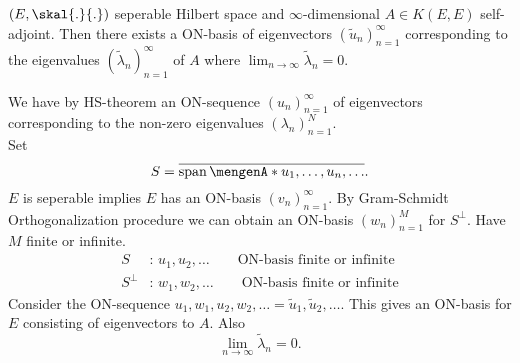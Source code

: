 \begin{theorem}
	$(E,\skal{.}{.})$ seperable Hilbert space and $\infty$-dimensional $A \in K(E,E)$ self-adjoint. Then there exists a ON-basis of eigenvectors $(\tilde u_n)_{n=1}^{\infty}$ corresponding to the eigenvalues $(\tilde \lambda_n)_{n=1}^{\infty}$ of $A$ where $\lim_{n \to \infty} \tilde \lambda_n = 0$.
\end{theorem}
\begin{beweis}
	We have by HS-theorem an ON-sequence $(u_n)_{n=1}^{\infty}$ of eigenvectors corresponding to the non-zero eigenvalues $(\lambda_n)_{n=1}^{N}$. \\
	Set
	\[
		S = \overline{\spn\set{u_1,\dots,u_n, \dots}}.
	\]
	$E$ is seperable implies $E$ has an ON-basis $(v_n)_{n=1}^{\infty}$. By Gram-Schmidt Orthogonalization procedure we can obtain an ON-basis $(w_n)_{n=1}^{M}$ for $S^{\perp}$. Have $M$ finite or infinite. \begin{align*}
		S &:\,u_1,u_2, \dots \qquad \text{ON-basis finite or infinite} \\
		S^{\perp} &:\,w_1,w_2, \dots \qquad \text{ON-basis finite or infinite}
	\end{align*}
	Consider the ON-sequence $u_1,w_1,u_2,w_2, \dots = \tilde u_1, \tilde u_2, \dots$. This gives an ON-basis for $E$ consisting of eigenvectors to $A$. Also
	\[
		\lim_{n \to \infty}\tilde \lambda_n = 0.
	\]
\end{beweis}